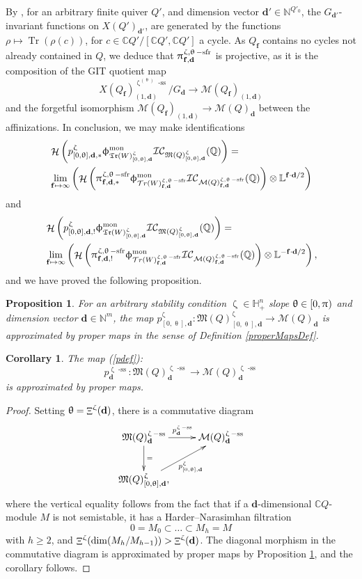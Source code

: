 \documentclass[a4paper,10pt]{amsart}
\newtheorem{proposition}[theorem]{Proposition}
\newtheorem{corollary}[theorem]{Corollary}
\newcommand{\dd}{\mathbf{d}}
\newcommand{\ff}{\mathbf{f}}
\newcommand{\LL}{\mathbb{L}}
\DeclareMathOperator{\sfr}{-sfr}
\newcommand{\WW}{\mathcal{T}r(W)}
\newcommand{\WWW}{\mathfrak{Tr}(W)}
\newcommand{\Mst}{\mathfrak{M}}
\newcommand{\Msp}{\mathcal{M}}
\newcommand{\ICS}{\mathcal{IC}}
\newcommand{\phim}[1]{\phi^{\mon}_{#1}}
\renewcommand{\theta}{\uptheta}
\renewcommand{\zeta}{\upzeta}
\renewcommand{\pi}{\uppi\hspace{0.05em}}
\renewcommand{\phi}{\upphi}
\DeclareMathOperator{\sst}{-ss}
\DeclareMathOperator{\mon}{mon}
\DeclareMathOperator{\Mu}{\Upxi}
\DeclareMathOperator{\Tr}{Tr}
\DeclareMathOperator{\Ho}{\mathcal{H}}
\begin{document}
By \cite[Thm.1]{LBP90}, for an arbitrary finite quiver $Q'$, and dimension vector $\dd'\in\mathbb{N}^{Q'_0}$, the $G_{\dd'}$-invariant functions on $X(Q')_{\dd'}$, are generated by the functions $\rho\mapsto\Tr(\rho(c))$, for $c\in\mathbb{C}Q'/[\mathbb{C}Q',\mathbb{C}Q']$ a cycle.  As $Q_{\ff}$ contains no cycles not already contained in $Q$, we deduce that $\pi^{\zeta,\theta\sfr}_{\ff,\dd}$ is projective, as it is the composition of the GIT quotient map 
\[
X(Q_{\ff})_{(1,\dd)}^{\zeta^{(\theta)}\sst}/G_\dd\rightarrow \Msp(Q_{\ff})_{(1,\dd)}
\]
and the forgetful isomorphism $\Msp(Q_{\ff})_{(1,\dd)}\rightarrow \Msp(Q)_{\dd}$ between the affinizations.  In conclusion, we may make identifications
\begin{align*}
&\Ho\left(p_{[0,\theta],\dd,*}^{\zeta}\phim{\WWW^{\zeta}_{[0,\theta],\dd}}\ICS_{\Mst(Q)_{[0,\theta],\dd}^{\zeta}}(\mathbb{Q})\right)=\\&\lim_{\ff\mapsto\infty}\left(\Ho\left(\pi_{\ff,\dd,*}^{\zeta,\theta\sfr}\phim{\WW^{\zeta,\theta\sfr}_{\ff,\dd}}\ICS_{\Msp(Q)^{\zeta,\theta\sfr}_{\ff,\dd}}(\mathbb{Q})\right)\otimes \LL^{\ff\cdot\dd/2}\right)
\end{align*}
and
\begin{align*}
&\Ho\left(p_{[0,\theta],\dd,!}^{\zeta}\phim{\WWW^{\zeta}_{[0,\theta],\dd}}\ICS_{\Mst(Q)_{[0,\theta],\dd}^{\zeta}}(\mathbb{Q})\right)=\\&\lim_{\ff\mapsto\infty}\left(\Ho\left(\pi_{\ff,\dd,!}^{\zeta,\theta\sfr}\phim{\WW^{\zeta,\theta\sfr}_{\ff,\dd}}\ICS_{\Msp(Q)^{\zeta,\theta\sfr}_{\ff,\dd}}(\mathbb{Q})\right)\otimes \LL^{{}-\ff\cdot\dd/2}\right),
\end{align*}
and we have proved the following proposition.
\begin{proposition}
\label{thapm}
For an arbitrary stability condition $\zeta\in \mathbb{H}_+^n$ slope $\theta\in[0,\pi)$ and dimension vector $\dd\in\mathbb{N}^m$, the map $p_{[0,\theta],\dd}^{\zeta}\colon \Mst(Q)_{[0,\theta],\dd}^{\zeta}\rightarrow \Msp(Q)_{\dd}$ is approximated by proper maps in the sense of Definition \ref{properMapsDef}.
\end{proposition}
\begin{corollary}\label{easyAPM}
The map (\ref{pdef}):
\begin{equation}
p^{\zeta\sst}_{\dd}\colon \Mst(Q)^{\zeta\sst}_\dd\rightarrow\Msp(Q)^{\zeta\sst}_\dd
\end{equation}
is approximated by proper maps.
\end{corollary}
\begin{proof}
Setting $\theta=\Mu^{\zeta}(\dd)$, there is a commutative diagram
\[
\xymatrix{
\Mst(Q)^{\zeta\sst}_\dd\ar[r]^{p^{\zeta\sst}_{\dd}}\ar[d]^=&\Msp(Q)^{\zeta\sst}_\dd\\
\Mst(Q)_{[0,\theta],\dd}^{\zeta}\ar[ur]_{p_{[0,\theta],\dd}^{\zeta}},
}
\]
where the vertical equality follows from the fact that if a $\dd$-dimensional $\mathbb{C}Q$-module $M$ is not semistable, it has a Harder--Narasimhan filtration
\[
0=M_0\subset\ldots \subset M_h=M
\]
with $h\geq 2$, and $\Mu^{\zeta}(\dim(M_h/M_{h-1}))>\Mu^{\zeta}(\dd)$.  The diagonal morphism in the commutative diagram is approximated by proper maps by Proposition \ref{thapm}, and the corollary follows.
\end{proof}
\end{document}
